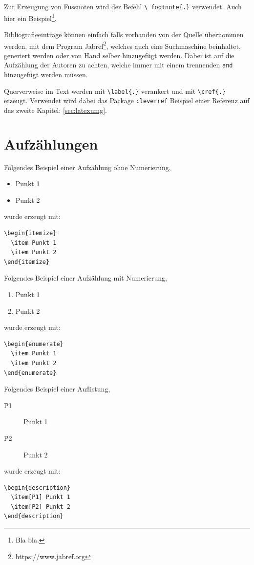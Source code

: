 Zur Erzeugung von Fussnoten wird der Befehl \texttt{\textbackslash
footnote\{.\}} verwendet. Auch hier ein Beispiel\footnote{Bla
bla.}.

Bibliografieeinträge können einfach falls vorhanden von der Quelle 
übernommen werden, mit dem Program 
Jabref\footnote{https://www.jabref.org}, welches auch eine Suchmaschine 
beinhaltet, generiert werden oder von Hand selber hinzugefügt werden. 
Dabei ist auf die Aufzählung der Autoren zu achten, welche immer mit 
einem trennenden \texttt{and} hinzugefügt werden müssen. 

Querverweise im Text werden mit \texttt{\textbackslash label\{.\}}
verankert und mit \texttt{\textbackslash cref\{.\}} erzeugt. 
Verwendet wird dabei das Package \texttt{cleverref}
Beispiel einer Referenz auf das zweite Kapitel:
\cref{sec:latexumg}.


\section{Aufzählungen}\label{sec:aufz}

Folgendes Beispiel einer Aufzählung ohne Numerierung,
\begin{itemize}
  \item Punkt 1
  \item Punkt 2
\end{itemize}
wurde erzeugt mit:
\begin{verbatim}
\begin{itemize}
  \item Punkt 1
  \item Punkt 2
\end{itemize}
\end{verbatim}

Folgendes Beispiel einer Aufzählung mit Numerierung,
\begin{enumerate}
  \item Punkt 1
  \item Punkt 2
\end{enumerate}
wurde erzeugt mit:
\begin{verbatim}
\begin{enumerate}
  \item Punkt 1
  \item Punkt 2
\end{enumerate}
\end{verbatim}

Folgendes Beispiel einer Auflistung,
\begin{description}
  \item[P1] Punkt 1
  \item[P2] Punkt 2
\end{description}
wurde erzeugt mit:
\begin{verbatim}
\begin{description}
  \item[P1] Punkt 1
  \item[P2] Punkt 2
\end{description}
\end{verbatim}


